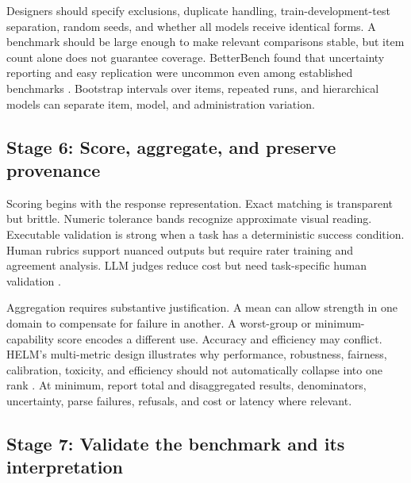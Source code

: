 \documentclass[12pt]{article}
\begin{document}
Designers should specify exclusions, duplicate handling, train-development-test separation, random seeds, and whether all models receive identical forms. A benchmark should be large enough to make relevant comparisons stable, but item count alone does not guarantee coverage. BetterBench found that uncertainty reporting and easy replication were uncommon even among established benchmarks \citep{reuel2024betterbench}. Bootstrap intervals over items, repeated runs, and hierarchical models can separate item, model, and administration variation.

\subsection{Stage 6: Score, aggregate, and preserve provenance}

Scoring begins with the response representation. Exact matching is transparent but brittle. Numeric tolerance bands recognize approximate visual reading. Executable validation is strong when a task has a deterministic success condition. Human rubrics support nuanced outputs but require rater training and agreement analysis. LLM judges reduce cost but need task-specific human validation \citep{bavaresco2025judges}.

Aggregation requires substantive justification. A mean can allow strength in one domain to compensate for failure in another. A worst-group or minimum-capability score encodes a different use. Accuracy and efficiency may conflict. HELM's multi-metric design illustrates why performance, robustness, fairness, calibration, toxicity, and efficiency should not automatically collapse into one rank \citep{liang2022helm}. At minimum, report total and disaggregated results, denominators, uncertainty, parse failures, refusals, and cost or latency where relevant.

\subsection{Stage 7: Validate the benchmark and its interpretation}
\end{document}
